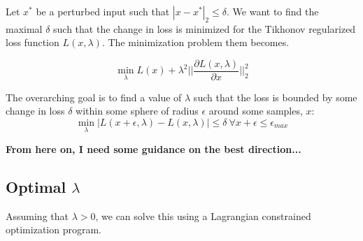 \documentclass[conference]{IEEEtran}
\begin{document}
Let $x^*$ be a perturbed input such that $|x - x^*|_2 \leq \delta$. We want to find the maximal $\delta$ such that the change in loss is minimized for the Tikhonov regularized loss function $L(x, \lambda)$. The minimization problem them becomes.

$$
\min_{\lambda} L(x) + \lambda^2 || \frac{\partial L(x, \lambda)}{ \partial x} ||_2^2
$$

The overarching goal is to find a value of $\lambda$ such that the loss is bounded by some change in loss $\delta$ within some sphere of radius $\epsilon$ around some samples, $x$:
\begin{equation}
\min_{\lambda}{|L(x + \epsilon, \lambda) - L(x, \lambda)| }\leq \delta~\forall x + \epsilon \leq \epsilon_{max}
\label{eq:delta}
\end{equation}

\textbf{From here on, I need some guidance on the best direction...}

 \subsection{Optimal $\lambda$}
 Assuming that $\lambda>0$, we can solve this using a Lagrangian constrained optimization program.




\end{document}

